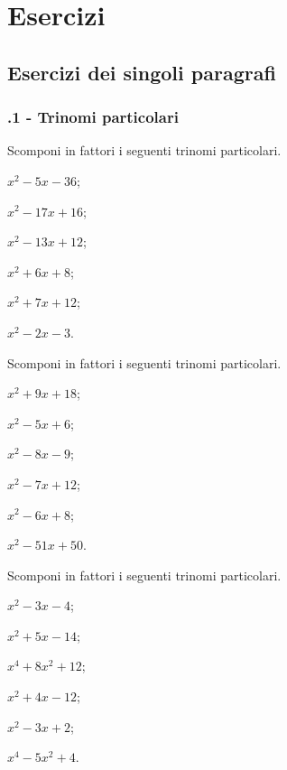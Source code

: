 \section{Esercizi}
\subsection{Esercizi dei singoli paragrafi}
\subsubsection*{\thechapter.1 - Trinomi particolari}

\begin{esercizio}
 \label{ese:17.1}
 Scomponi in fattori i seguenti trinomi particolari.
 \begin{multicols}{3}
 \begin{enumeratea}
 \item $x^{2}-5x-36$;
 \item $x^{2}-17x+16$;
 \item $x^{2}-13x+12$;
 \item $x^{2}+6x+8$;
 \item $x^{2}+7x+12$;
 \item $x^{2}-2x-3$.
 \end{enumeratea}
\end{multicols}
\end{esercizio}

\begin{esercizio}
 \label{ese:17.2}
 Scomponi in fattori i seguenti trinomi particolari.
 \begin{multicols}{3}
 \begin{enumeratea}
 \item $x^{2}+9x+18$;
 \item $x^{2}-5x+6$;
 \item $x^{2}-8x-9$;
 \item $x^{2}-7x+12$;
 \item $x^{2}-6x+8$;
 \item $x^{2}-51x+50$.
 \end{enumeratea}
\end{multicols}
\end{esercizio}

\begin{esercizio}
 \label{ese:17.3}
 Scomponi in fattori i seguenti trinomi particolari.
 \begin{multicols}{3}
 \begin{enumeratea}
 \item $x^{2}-3x-4$;
 \item $x^{2}+5x-14$;
 \item $x^{4}+8x^{2}+12$;
 \item $x^{2}+4x-12$;
 \item $x^{2}-3x+2$;
 \item $x^{4}-5x^{2}+4$.
 \end{enumeratea}
\end{multicols}
\end{esercizio}


